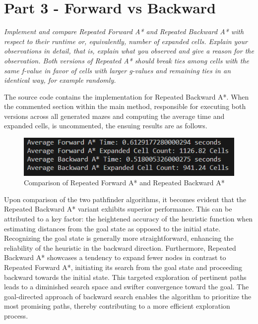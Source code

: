 \graphicspath{{Images/}}

\section{Part 3 - Forward vs Backward}

\textit{Implement and compare Repeated Forward A* and Repeated Backward A*
with respect to their runtime or, equivalently, number of expanded cells. Explain your observations in detail, that is, explain
what you observed and give a reason for the observation. Both versions of Repeated A* should break ties among cells with
the same f-value in favor of cells with larger g-values and remaining ties in an identical way, for example randomly.}

The source code contains the implementation for Repeated Backward A*. When the commented section within the main method, responsible for executing both versions across all generated mazes and computing the average time and expanded cells, is uncommented, the ensuing results are as follows.

\begin{figure}[h]
    \centering
    \includegraphics[width=.85\linewidth]{imgs/Results of Foward A vs Backward A.png}
    \caption{Comparison of Repeated Forward A* and Repeated Backward A*}
    \label{fig:my_label}
\end{figure}

Upon comparison of the two pathfinder algorithms, it becomes evident that the Repeated Backward A* variant exhibits superior performance. This can be attributed to a key factor: the heightened accuracy of the heuristic function when estimating distances from the goal state as opposed to the initial state. Recognizing the goal state is generally more straightforward, enhancing the reliability of the heuristic in the backward direction. Furthermore, Repeated Backward A* showcases a tendency to expand fewer nodes in contrast to Repeated Forward A*, initiating its search from the goal state and proceeding backward towards the initial state. This targeted exploration of pertinent paths leads to a diminished search space and swifter convergence toward the goal. The goal-directed approach of backward search enables the algorithm to prioritize the most promising paths, thereby contributing to a more efficient exploration process.



